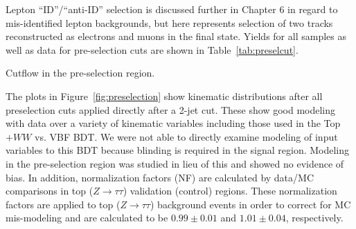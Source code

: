 Lepton ``ID''/``anti-ID'' selection is discussed further in Chapter 6 in regard to mis-identified lepton backgrounds, but here represents selection of two tracks reconstructed as electrons and muons in the final state. Yields for all samples as well as data for pre-selection cuts are shown in Table~\ref{tab:preselcut}.
\begin{table}[h!]
\resizebox{\textwidth}{!}{

}
\caption{Cutflow in the pre-selection region.}
\label{tab:preselcut}
\end{table}

The plots in Figure~\ref{fig:preselection} show kinematic distributions after all preselection cuts applied directly after a 2-jet cut. These show good modeling with data over a variety of kinematic variables including those used in the Top$+WW$ vs. VBF BDT. We were not able to directly examine modeling of input variables to this BDT because blinding is required in the signal region. Modeling in the pre-selection region was studied in lieu of this and showed no evidence of bias. In addition, normalization factors (NF) are calculated by data/MC comparisons in top ($Z\rightarrow\tau\tau$) validation (control) regions. These normalization factors are applied to top ($Z\rightarrow\tau\tau$) background events in order to correct for MC mis-modeling and are calculated to be $0.99\pm0.01$ and $1.01\pm0.04$, respectively. 

